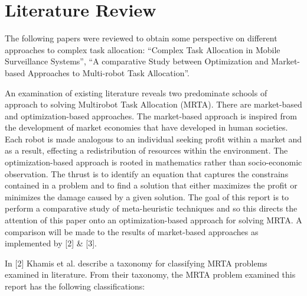 \documentclass[a4paper]{article}
\begin{document}



\section{Literature Review}
The following papers were reviewed to obtain some perspective on different approaches to complex task allocation:
``Complex Task Allocation in Mobile Surveillance Systems'', ``A comparative Study between Optimization and
Market-based Approaches to Multi-robot Task Allocation''.

An examination of existing literature reveals two predominate schools of approach to solving Multirobot Task Allocation (MRTA). There are market-based and optimization-based approaches.
The market-based approach is inspired from the development of market economies that have developed in human societies.
Each robot is made analogous to an individual seeking profit within a market and as a result, effecting a redistribution of resources within the environment.
The optimization-based approach is rooted in mathematics rather than socio-economic observation.
The thrust is to identify an equation that captures the constrains contained in a problem and to find a solution that either maximizes the profit or minimizes the damage caused by a given solution.
The goal of this report is to perform a comparative study of meta-heuristic techniques and so this directs the attention of this paper onto an optimization-based approach for solving MRTA.
A comparison will be made to the results of market-based approaches as implemented by [2] \& [3].

In [2] Khamis et al. describe a taxonomy for classifying MRTA problems examined in literature. From their taxonomy, the MRTA problem examined this report has the following classifications:
\end{document}

